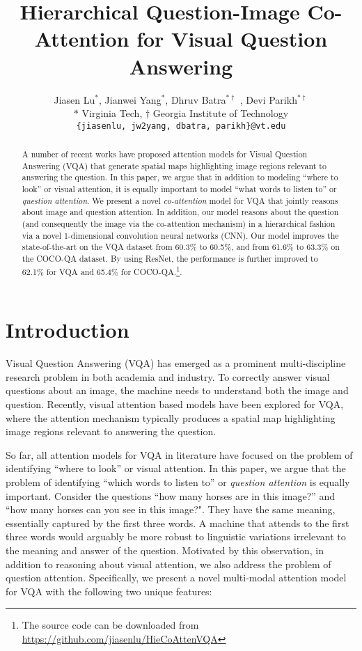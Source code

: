 \documentclass{article}
\title{Hierarchical Question-Image Co-Attention \newline for Visual Question Answering}
\author{Jiasen Lu$^*$, Jianwei Yang$^*$, Dhruv Batra$^{* \dagger}$ , Devi Parikh$^{* \dagger}$\\
$*$ Virginia Tech, $\dagger$ Georgia Institute of Technology \\
{\tt\small \{jiasenlu, jw2yang, dbatra, parikh\}@vt.edu}
}
\begin{document}
\maketitle
\begin{abstract}
A number of recent works have proposed attention models for Visual Question Answering (VQA) that generate spatial maps highlighting image regions relevant to answering the question. In this paper, we argue that in addition to modeling ``where to look'' or visual attention, it is equally important to model ``what words to listen to'' or \emph{question attention}. We present a novel \emph{co-attention} model for VQA that jointly reasons about image and question attention. In addition, our model reasons about the question (and consequently the image via the co-attention mechanism) in a hierarchical fashion via a novel 1-dimensional convolution neural networks (CNN). Our model improves the state-of-the-art on the VQA dataset from 60.3\% to 60.5\%, and from 61.6\% to 63.3\% on the COCO-QA dataset. By using ResNet, the performance is further improved to 62.1\% for VQA and 65.4\% for COCO-QA.\footnote{The source code can be downloaded from \url{https://github.com/jiasenlu/HieCoAttenVQA}}.
\end{abstract}
\section{Introduction}
\label{sec:intro}
\vspace*{-2mm}
Visual Question Answering (VQA) \cite{antol2015vqa, gao2015you, malinowski2015ask, ren2015exploring, zitnick2016measuring} has emerged as a prominent multi-discipline research problem in both academia and industry. To correctly answer visual questions about an image, the machine needs to understand both the image and question.
Recently, visual attention based models \cite{shih2015look, xiong2016dynamic, xu2015ask, yang2015stacked} have been explored for VQA, where the attention mechanism typically produces a spatial map highlighting image regions relevant to answering the question. 

So far, all attention models for VQA in literature have focused on the problem of identifying ``where to look'' or visual attention. In this paper, we argue that the problem of identifying ``which words to listen to''  or \emph{question attention} is equally important.  Consider the questions ``how many horses are in this image?'' and ``how many horses can you see in this image?". They have the same meaning, essentially captured by the first three words. A machine that attends to the first three words would arguably be more robust to linguistic variations irrelevant to the meaning and answer of the question. Motivated by this observation, in addition to reasoning about visual attention, we also address the problem of question attention. Specifically, we present a novel multi-modal attention model for VQA with the following two unique features:
\end{document}
